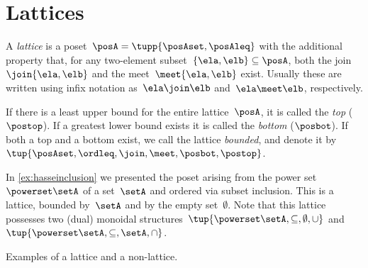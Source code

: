 

\section{Lattices}



\begin{definition}[Lattice]
    \label{def:lattice}
    A \emph{lattice} is a poset~$\posA=\tupp{\posAset,\posAleq}$ with the additional property that, for any two-element subset~$\{\ela, \elb \} \subseteq \posA$, both the join~$\join \{\ela, \elb \}$ and the meet~$\meet \{\ela, \elb \}$ exist.
    Usually these are written using infix notation as~$\ela \join \elb$ and~$\ela \meet \elb$, respectively.
\end{definition}


\begin{remark}
    \label{rem:bounded-lattices}
    \label{def:top}
    \label{def:bot}
    If there is a least upper bound for the entire lattice~$\posA$, it is called
    the \emph{top} ($\postop$). If a greatest lower bound exists it is called the \emph{bottom} ($\posbot$).
    If both a top and a bottom exist, we call the lattice \emph{bounded}, and denote it by~$\tup{\posAset,\ordleq,\join,\meet,\posbot,\postop}$.
\end{remark}

\begin{example}
    In \cref{ex:hasseinclusion} we presented the poset arising from the power set~$\powerset \setA$ of a set~$\setA$ and ordered via subset inclusion.
    This is a lattice, bounded by~$\setA$ and by the empty set~$\emptyset$.
    Note that this lattice possesses two (dual) monoidal structures~$\tup{\powerset \setA,\subseteq,\emptyset,\cup}$ and~$\tup{\powerset \setA,\subseteq,\setA,\cap}$.
\end{example}
\begin{marginfigure}
    
    
    \caption{Examples of a lattice and a non-lattice. }
    \label{fig:exlattice}
\end{marginfigure}

